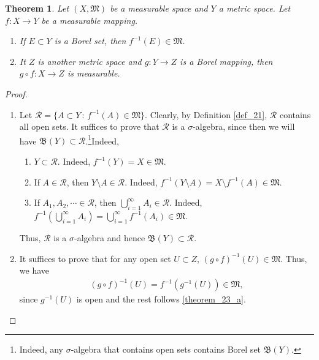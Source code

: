 \documentclass[11pt]{book}
\newtheorem{theorem}{Theorem}[chapter]
\theoremstyle{definition}
\numberwithin{equation}{chapter}
\def\BB{\mathfrak{B}}
\begin{document}
\begin{theorem}
Let $(X,\mathfrak{M})$ be a measurable space and $Y$ a metric space. Let $f:X\to Y$ be a measurable mapping.
\begin{enumerate}[label=(\alph*)]
    \item If $E \subset Y$ is a Borel set, then $f^{-1}(E) \in \mathfrak{M}$.\label{theorem_23_a}
    
    \item It $Z$ is another metric space and $g:Y\to Z$ is a Borel mapping, then $g\circ f:X \to Z$ is measurable.
\end{enumerate}
\end{theorem}
\begin{proof}
~\begin{enumerate}[label=(\alph*)]
    \item Let $\mathcal{R} = \{A \subset Y\,:\, f^{-1}(A) \in \mathfrak{M}\}$. Clearly, by Definition \ref{def_21}, $\mathcal{R}$ contains all open sets. It suffices to prove that $\mathcal{R}$ is a $\sigma$-algebra, since then we will have $\BB(Y) \subset \mathcal{R}$.\footnote{Indeed, any $\sigma$-algebra that contains open sets contains Borel set $\BB(Y)$.}Indeed, 
    \begin{enumerate}[label=\arabic*)]
        \item $Y \subset \mathcal{R}$. Indeed, $f^{-1}(Y) = X \in \mathfrak{M}$.
        
        \item If $A \in \mathcal{R}$, then $Y \setminus A \in \mathcal{R}$. Indeed, $f^{-1}(Y\setminus A) = X \setminus f^{-1}(A) \in \mathfrak{M}$.
        
        \item If $A_1, A_2, \cdots \in \mathcal{R}$, then $\bigcup^\infty_{i=1}A_i \in \mathcal{R}$. Indeed, $f^{-1}\left(\bigcup^\infty_{i=1}A_i\right) = \bigcup^\infty_{i=1} f^{-1}(A_i) \in \mathfrak{M}$.
    \end{enumerate}
    Thus, $\mathcal{R}$ is a $\sigma$-algebra and hence $\BB(Y) \subset \mathcal{R}$.
    
    \item It suffices to prove that for any open set $U \subset Z$, $(g\circ f)^{-1}(U) \in \mathfrak{M}$. Thus, we have
    \begin{align*}
        (g\circ f)^{-1}(U) = f^{-1} \left(g^{-1}(U)\right) \in \mathfrak{M},
    \end{align*}
    since $g^{-1}(U)$ is open and the rest follows \ref{theorem_23_a}.
\end{enumerate}
\end{proof}
\end{document}

